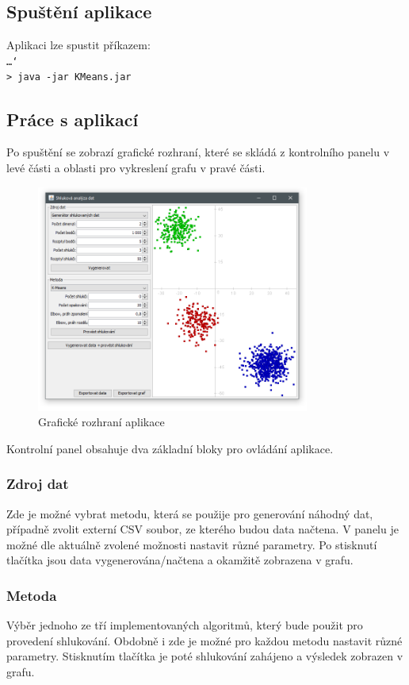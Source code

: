 \documentclass[pdftex,a4paper]{article}
\begin{document}
\subsection{Spuštění aplikace}
Aplikaci lze spustit příkazem:
\\[2mm]
\texttt{\ldots\char`\\ > java -jar KMeans.jar}


\subsection{Práce s aplikací}
Po spuštění se zobrazí grafické rozhraní, které se skládá z kontrolního panelu v levé části a oblasti pro vykreslení grafu v pravé části.


\begin{figure}[h]
	\centering
	\includegraphics[width=0.8\textwidth]{res/gui.png}
	\caption{Grafické rozhraní aplikace}
	\label{fig:obr-gui}
\end{figure}


Kontrolní panel obsahuje dva základní bloky pro ovládání aplikace.

\subsubsection*{Zdroj dat}
Zde je možné vybrat metodu, která se použije pro generování náhodný dat, případně zvolit externí CSV soubor, ze kterého budou data načtena. V panelu je možné dle aktuálně zvolené možnosti nastavit různé parametry. Po stisknutí tlačítka jsou data vygenerována/načtena a okamžitě zobrazena v grafu.

\subsubsection*{Metoda}
Výběr jednoho ze tří implementovaných algoritmů, který bude použit pro provedení shlukování. Obdobně i zde je možné pro každou metodu nastavit různé parametry. Stisknutím tlačítka je poté shlukování zahájeno a výsledek zobrazen v grafu.
\end{document}
